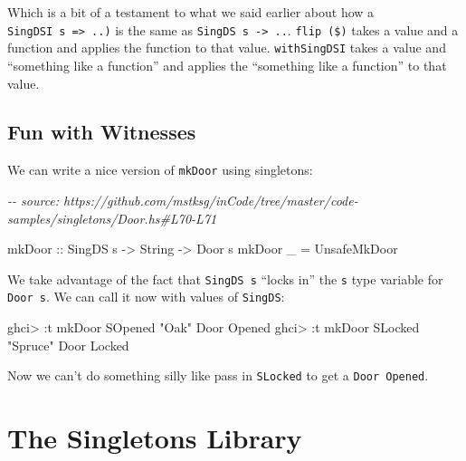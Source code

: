 \documentclass[]{article}
\newenvironment{Shaded}{}{}
\newcommand{\CommentTok}[1]{\textcolor[rgb]{0.38,0.63,0.69}{\textit{#1}}}
\newcommand{\DataTypeTok}[1]{\textcolor[rgb]{0.56,0.13,0.00}{#1}}
\newcommand{\NormalTok}[1]{#1}
\newcommand{\OperatorTok}[1]{\textcolor[rgb]{0.40,0.40,0.40}{#1}}
\newcommand{\OtherTok}[1]{\textcolor[rgb]{0.00,0.44,0.13}{#1}}
\newcommand{\StringTok}[1]{\textcolor[rgb]{0.25,0.44,0.63}{#1}}
\begin{document}
Which is a bit of a testament to what we said earlier about how a
\texttt{SingDSI\ s\ =\textgreater{}\ ..)} is the same as
\texttt{SingDS\ s\ -\textgreater{}\ ..}. \texttt{flip\ (\$)} takes a value and a
function and applies the function to that value. \texttt{withSingDSI} takes a
value and ``something like a function'' and applies the ``something like a
function'' to that value.

\hypertarget{fun-with-witnesses}{%
\subsection{Fun with Witnesses}\label{fun-with-witnesses}}

We can write a nice version of \texttt{mkDoor} using singletons:

\begin{Shaded}
\begin{Highlighting}[]
\CommentTok{{-}{-} source: https://github.com/mstksg/inCode/tree/master/code{-}samples/singletons/Door.hs\#L70{-}L71}

\OtherTok{mkDoor ::} \DataTypeTok{SingDS}\NormalTok{ s }\OtherTok{{-}>} \DataTypeTok{String} \OtherTok{{-}>} \DataTypeTok{Door}\NormalTok{ s}
\NormalTok{mkDoor \_ }\OtherTok{=} \DataTypeTok{UnsafeMkDoor}
\end{Highlighting}
\end{Shaded}

We take advantage of the fact that \texttt{SingDS\ s} ``locks in'' the
\texttt{s} type variable for \texttt{Door\ s}. We can call it now with values of
\texttt{SingDS}:

\begin{Shaded}
\begin{Highlighting}[]
\NormalTok{ghci}\OperatorTok{>} \OperatorTok{:}\NormalTok{t mkDoor }\DataTypeTok{SOpened} \StringTok{"Oak"}
\DataTypeTok{Door} \DataTypeTok{\textquotesingle{}Opened}
\NormalTok{ghci}\OperatorTok{>} \OperatorTok{:}\NormalTok{t mkDoor }\DataTypeTok{SLocked} \StringTok{"Spruce"}
\DataTypeTok{Door} \DataTypeTok{\textquotesingle{}Locked}
\end{Highlighting}
\end{Shaded}

Now we can't do something silly like pass in \texttt{SLocked} to get a
\texttt{Door\ \textquotesingle{}Opened}.

\hypertarget{the-singletons-library}{%
\section{The Singletons Library}\label{the-singletons-library}}
\end{document}
